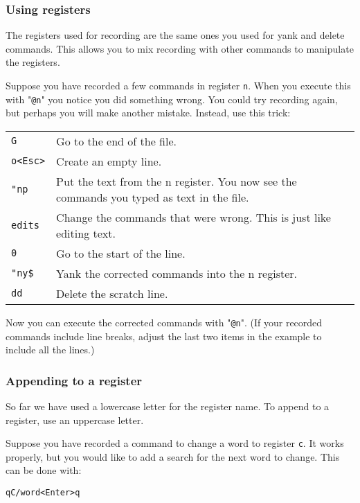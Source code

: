 \subsubsection{Using registers}
The registers used for recording are the same ones you used for yank and delete commands.
This allows you to mix recording with other commands to manipulate the registers.

Suppose you have recorded a few commands in register \texttt{n}.
When you execute this with "\texttt{@n}" you notice you did something wrong.
You could try recording again, but perhaps you will make another mistake.
Instead, use this trick:

\begin{center}\begin{tabular}{l l}
				\texttt{G} & Go to the end of the file. \\
				\texttt{o<Esc>} & Create an empty line. \\
				\texttt{"np} & Put the text from the n register.  You now see the commands you typed as text in the file. \\
				\texttt{{edits}} & Change the commands that were wrong.  This is just like editing text. \\
				\texttt{0} & Go to the start of the line. \\
				\texttt{"ny\$} & Yank the corrected commands into the n register. \\
				\texttt{dd} & Delete the scratch line. \\
\end{tabular}\end{center}

Now you can execute the corrected commands with "\texttt{@n}".
(If your recorded commands include line breaks, adjust the last two items in the example to include all the lines.)
\subsubsection{Appending to a register}
So far we have used a lowercase letter for the register name.
To append to a register, use an uppercase letter.

Suppose you have recorded a command to change a word to register \texttt{c}.
It works properly, but you would like to add a search for the next word to change.
This can be done with:

\begin{Verbatim}[samepage=true]
 qC/word<Enter>q
\end{Verbatim}

